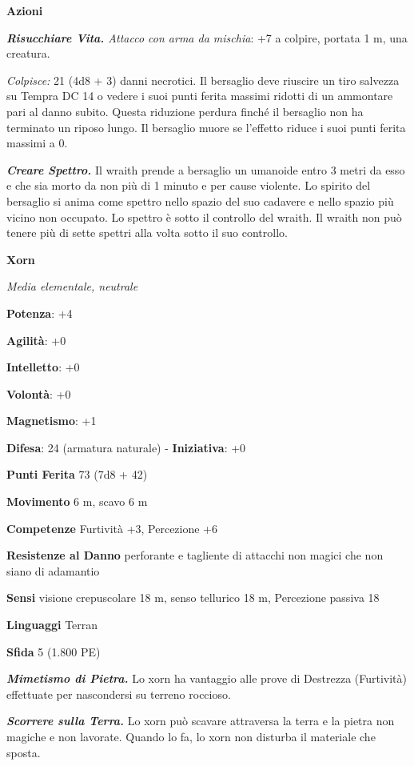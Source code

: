 \begin{multicols}{2}
\smallskip\textbf{Azioni}

\emph{\textbf{Risucchiare Vita.} Attacco con arma da mischia}: +7 a
colpire, portata 1 m, una creatura.

\emph{Colpisce:} 21 (4d8 + 3) danni necrotici. Il bersaglio deve
riuscire un tiro salvezza su Tempra DC 14 o vedere i suoi punti
ferita massimi ridotti di un ammontare pari al danno subito. Questa
riduzione perdura finché il bersaglio non ha terminato un riposo lungo.
Il bersaglio muore se l'effetto riduce i suoi punti ferita massimi a 0.

\emph{\textbf{Creare Spettro.}} Il wraith prende a bersaglio un umanoide
entro 3 metri da esso e che sia morto da non più di 1 minuto e per cause
violente. Lo spirito del bersaglio si anima come spettro nello spazio
del suo cadavere e nello spazio più vicino non occupato. Lo spettro è
sotto il controllo del wraith. Il wraith non può tenere più di sette
spettri alla volta sotto il suo controllo.

\textbf{Xorn}

\emph{Media elementale, neutrale}

\textbf{Potenza}: +4

\textbf{Agilità}: +0

\textbf{Intelletto}: +0

\textbf{Volontà}: +0

\textbf{Magnetismo}: +1

\textbf{Difesa}: 24 (armatura naturale) - \textbf{Iniziativa}: +0

\textbf{Punti Ferita} 73 (7d8 + 42)

\textbf{Movimento} 6 m, scavo 6 m

\textbf{Competenze} Furtività +3, Percezione +6

\textbf{Resistenze al Danno} perforante e tagliente di attacchi non
magici che non siano di adamantio

\textbf{Sensi} visione crepuscolare 18 m, senso tellurico 18 m, Percezione
passiva 18

\textbf{Linguaggi} Terran

\textbf{Sfida} 5 (1.800 PE)\smallskip

\emph{\textbf{Mimetismo di Pietra.}} Lo xorn ha vantaggio alle prove di
Destrezza (Furtività) effettuate per nascondersi su terreno roccioso.

\emph{\textbf{Scorrere sulla Terra.}} Lo xorn può scavare attraversa la
terra e la pietra non magiche e non lavorate. Quando lo fa, lo xorn non
disturba il materiale che sposta.


\end{multicols}
